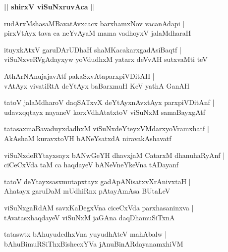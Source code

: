 \documentclass[twoside,12pt,openright]{book}
\newcounter{shloka}[chapter]
\def\uvaca#1{\centerline{{\large\textbf{#1}}}}
\begin{document}
\uvaca{|| shirxV viSuNxruvAca ||}

\begin{shloka}%
rudArxMshasaMBavatAvxcacx barxhamxNov vacanAdapi |\\
pirxVtAyx tava ca neYvAyaM mama vadhoyxV jalaMdharaH 
\end{shloka}

\begin{shloka}%
ituyxkAtxV garuDArUDhaH shaMKacakarxgadAsiBaqtf |\\
viSuNxveRVgAdayxyw yoVdudhxM yatarx deVvAH sutxvaMti teV 
\end{shloka}

\begin{shloka}%
AthArNAnujajavAtf pakaSxvAtaparxpiVDitAH |\\
vAtAyx vivatiRtA deYtAyx baBarxmuH KeV yathA GanAH 
\end{shloka}

\begin{shloka}%
tatoV jalaMdharoV daqSATxvX deYtAyxnAvxtAyx parxpiVDitAnf |\\
udavxqqtayx nayaneV korxVdhAtatxtoV viSuNxM samaBayxgAtf 
\end{shloka}

\begin{shloka}%
tatasaxmaBavaduyxdadhxM viSuNxdeYteyxVMdarxyoVramxhatf |\\
AkAshaM kuravxtoVH bANeYsatxdA niravakAshavatf 
\end{shloka}

\begin{shloka}%
viSuNxdeRYtayxsayx bANwGeYH dhavxjaM CatarxM dhanuhaRyAnf |\\
ciCeCxVda taM ca haqdayeV bANeVneYkeVna tADayanf 
\end{shloka}

\begin{shloka}%
tatoV deYtayxsasxmutapxtayx gadApANisatxvXrAnivxtaH |\\
Ahatayx garuDaM mUdhiRnx pAtayAmAsa BUtaLeV 
\end{shloka}

\begin{shloka}%
viSuNxgaRdAM savxKaDegxVna ciceCxVda parxhasaninxva |\\
tAvatasxhaqdayeV viSuNxM jaGAna daqDhamuSiTxnA 
\end{shloka}

\begin{shloka}%
tataswtx bAhuyudedhxVna yuyudhAteV mahAbalw |\\
bAhuBimuRSiThxBishecxYVa jAnuBinARdayanamxhiVM 
\end{shloka}
\end{document}
